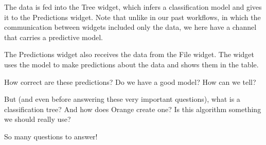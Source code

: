 The data is fed into the Tree widget, which infers a classification model and gives it to the Predictions widget. Note that unlike in our past workflows, in which the communication between widgets included only the data, we here have a channel that carries a predictive model.

The Predictions widget also receives the data from the File widget. The widget uses the model to make predictions about the data and shows them in the table.

How correct are these predictions? Do we have a good model? How can we tell?

But (and even before answering these very important questions), what is a classification tree? And how does Orange create one? Is this algorithm something we should really use?

So many questions to answer!
